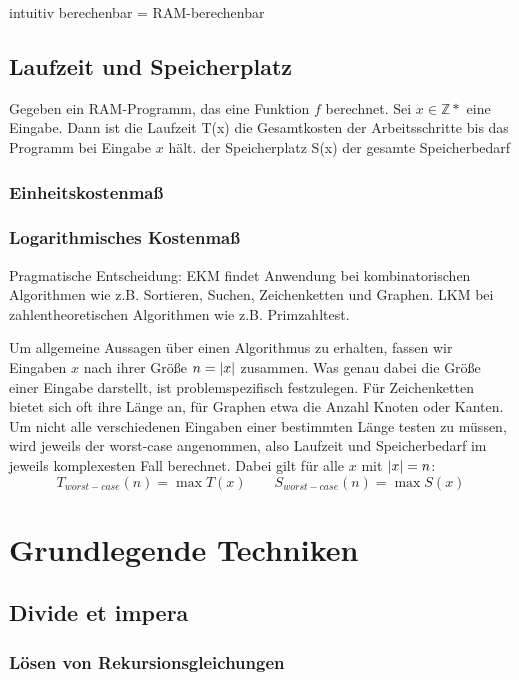 intuitiv berechenbar = RAM-berechenbar

\subsection{Laufzeit und Speicherplatz}

Gegeben ein RAM-Programm, das eine Funktion $f$ berechnet.
Sei $x \in \mathbb{Z}*$ eine Eingabe. Dann ist
die Laufzeit T(x) die Gesamtkosten der Arbeitsschritte bis das Programm bei Eingabe $x$ hält.
der Speicherplatz S(x) der gesamte Speicherbedarf

\subsubsection{Einheitskostenmaß}
\subsubsection{Logarithmisches Kostenmaß}

Pragmatische Entscheidung: EKM findet Anwendung bei kombinatorischen Algorithmen wie z.B. Sortieren, Suchen, Zeichenketten und Graphen.
LKM bei zahlentheoretischen Algorithmen wie z.B. Primzahltest.

Um allgemeine Aussagen über einen Algorithmus zu erhalten, fassen wir Eingaben $x$ nach ihrer Größe $n = \left|x\right|$ zusammen.
Was genau dabei die Größe einer Eingabe darstellt, ist problemspezifisch festzulegen.
Für Zeichenketten bietet sich oft ihre Länge an, für Graphen etwa die Anzahl Knoten oder Kanten.
Um nicht alle verschiedenen Eingaben einer bestimmten Länge testen zu müssen, wird jeweils der worst-case angenommen,
also Laufzeit und Speicherbedarf im jeweils komplexesten Fall berechnet.
Dabei gilt für alle $x$ mit $\left|x\right| = n$:
$$T_{worst-case}(n) = \max T(x) \qquad S_{worst-case}(n) = \max S(x)$$

\section{Grundlegende Techniken}

\subsection{Divide et impera}

\subsubsection{Lösen von Rekursionsgleichungen}

